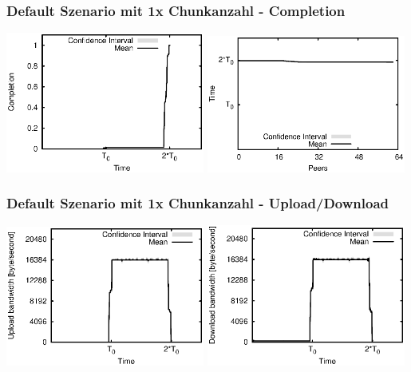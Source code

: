 \begin{frame}
  \frametitle{Default Szenario mit 1x Chunkanzahl - Completion}
  \begin{center}
    \includegraphics[width=0.49\textwidth]{fig/plots/scenario_7_chunk_count_fac_1/plots/GeneratedMeanChunkCompletion.csv.eps}
    \hfill
    \includegraphics[width=0.49\textwidth]{fig/plots/scenario_7_chunk_count_fac_1/plots/GeneratedMeanSortedChunkCompletion.csv.eps}
  \end{center}
\end{frame}


\begin{frame}
  \frametitle{Default Szenario mit 1x Chunkanzahl - Upload/Download}
  \begin{center}
    \includegraphics[width=0.49\textwidth]{fig/plots/scenario_7_chunk_count_fac_1/plots/GeneratedMeanCurrentUploadBandwidth.csv.eps}
    \includegraphics[width=0.49\textwidth]{fig/plots/scenario_7_chunk_count_fac_1/plots/GeneratedMeanCurrentDownloadBandwidth.csv.eps}
  \end{center}
\end{frame}


